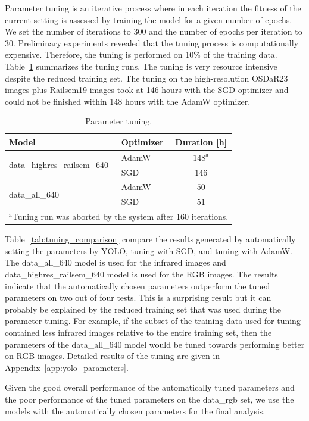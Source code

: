 \documentclass[Master,MDS,english]{BASE/twbook} %
\begin{document}
Parameter tuning is an iterative process where in each iteration the fitness of the current setting is assessed by training the model for a given number of epochs. We set the number of iterations to 300 and the number of epochs per iteration to 30.  Preliminary experiments revealed that the tuning process is computationally expensive. Therefore, the tuning is performed on 10\% of the training data. 
Table~\ref{tab:model_duration} summarizes the tuning runs. The tuning is very resource intensive despite the reduced training set. The tuning on the high-resolution  OSDaR23 images plus Railsem19 images took at 146 hours with the SGD optimizer and could not be finished within 148 hours with the AdamW optimizer.  

\begin{table}[htbp]
\centering
\footnotesize
\begin{tabular}{|llc|}
\toprule
\textbf{Model} & \textbf{Optimizer} & \textbf{Duration [h]} \\ 
\midrule
\multirow{2}{*}{data\_highres\_railsem\_640} & AdamW & $148^\mathrm{a}$\\
& SGD & $146$ \\
\midrule
\multirow{2}{*}{data\_all\_640} & AdamW & $50$ \\
& SGD & $51$ \\
\bottomrule
\multicolumn{3}{l}{$^{\mathrm{a}}$Tuning run was aborted by the system after 160 iterations.} \\
\end{tabular}
\caption{Parameter tuning.}
\label{tab:model_duration}
\end{table}

Table~\ref{tab:tuning_comparison} compare the results generated by automatically setting the parameters by YOLO, tuning with SGD, and tuning with AdamW. The data\_all\_640 model is used for the infrared images and data\_highres\_railsem\_640 model is used for the RGB images.
The results indicate that the automatically chosen parameters outperform the tuned parameters on two out of four tests. This is a surprising result but it can probably be explained by the reduced training set that was used during the parameter tuning. For example, if the subset of the training data used for tuning contained less infrared images relative to the entire training set, then the parameters of the data\_all\_640 model would be tuned towards performing better on RGB images. Detailed results of the tuning are given in Appendix~\ref{app:yolo_parameters}.

Given the good overall performance of the automatically tuned parameters and the poor performance of the tuned parameters on the data\_rgb set, we use the models  with the automatically chosen parameters for the final analysis.   
\end{document}
